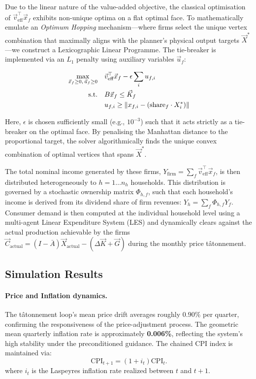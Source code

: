 Due to the linear nature of the value-added objective, the classical optimisation of $\vec{v}_{\text{eff}}^\top \vec{x}_f$ exhibits non-unique optima on a flat optimal face. To mathematically emulate an \textit{Optimum Hopping} mechanism---where firms select the unique vertex combination that maximally aligns with the planner's physical output targets $\vec{X}^*$---we construct a Lexicographic Linear Programme. The tie-breaker is implemented via an $L_1$ penalty using auxiliary variables $\vec{u}_f$:

\begin{align}\label{eq:firm_lp}
\max_{\vec{x}_f \geq 0,\, \vec{u}_f \ge 0} &\quad \vec{v}_{\text{eff}}^\top \vec{x}_f - \epsilon \sum_i u_{f,i} \\
\text{s.t.} &\quad B \vec{x}_f \leq \vec{K}_f \notag\\
            &\quad u_{f,i} \geq \| x_{f,i} - (\text{share}_f \cdot X^*_i) \| \notag\\
\end{align}

Here, $\epsilon$ is chosen sufficiently small (e.g., $10^{-3}$) such that it acts strictly as a tie-breaker on the optimal face. By penalising the Manhattan distance to the proportional target, the solver algorithmically finds the unique convex combination of optimal vertices that spans $\vec{X}^*$.

The total nominal income generated by these firms, $Y_{\text{firm}} = \sum_f \vec{v}_{\text{eff}}^\top \vec{x}_f$, is then distributed heterogeneously to $h = 1 \dots n_h$ households. This distribution is governed by a stochastic ownership matrix $\Phi_{h,f}$, such that each household's income is derived from its dividend share of firm revenues: $Y_h = \sum_f \Phi_{h,f} Y_f$. Consumer demand is then computed at the individual household level using a multi-agent Linear Expenditure System (LES) and dynamically clears against the actual production achievable by the firms $\vec{C}_{\text{actual}} = (I-\bar{A})\vec{X}_{\text{actual}} - (\Delta \vec{K} + \vec{G})$ during the monthly price tâtonnement.

\subsection{Simulation Results}
\label{subsec:solver_results}

\paragraph{Price and Inflation dynamics.}
The tâtonnement loop's mean price drift averages roughly $0.90\%$ per quarter,
confirming the responsiveness of the price-adjustment process.
The geometric mean quarterly inflation rate is approximately \textbf{0.006\%}, reflecting
the system's high stability under the preconditioned guidance.
The chained CPI index is maintained via:
%
\begin{equation}\label{eq:cpi_update}
  \text{CPI}_{t+1} = (1 + i_t) \text{CPI}_t.
\end{equation}
%
where $i_t$ is the Laspeyres inflation rate realized between $t$ and $t+1$.


